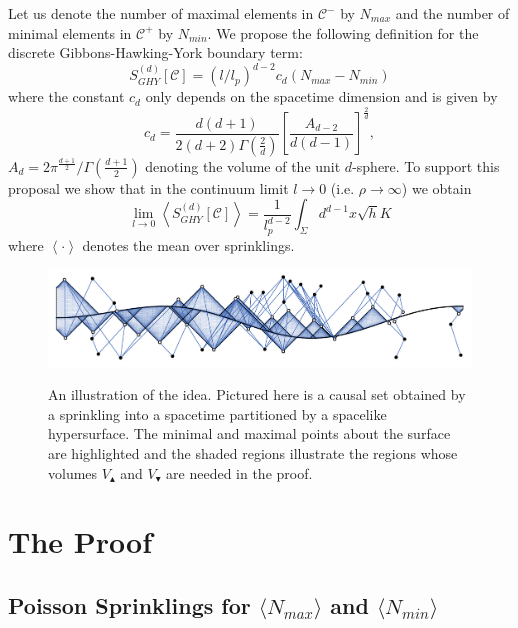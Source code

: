 \documentclass[12pt]{article}
\newcommand{\be}{\begin{equation}}
\newcommand{\ee}{\end{equation}}
\newcommand{\mb}[1]{\marginnote{\texttt{\small MB:\,#1}}}
\begin{document}
Let us denote the number of maximal elements in $\mathcal C^-$ by $N_{max}$ and the number of minimal elements in $\mathcal C^+$  by $N_{min}$. We propose the following definition for the discrete Gibbons-Hawking-York boundary term:\mb{$S[\mathcal C, \Sigma]$?}
\be\label{GH_boundary_to_causet}
S^{(d)}_{GHY}[\mathcal C]=\left(l/l_p\right)^{d-2}c_{d}\left(N_{max}-N_{min}\right)
\ee
where the constant $c_{d}$ only depends on the spacetime dimension and is given by
\be\label{Cn}
c_{d}=\frac{d(d+1)}{2(d+2)\Gamma\left(\frac{2}{d}\right)}\left[\frac{A_{d-2}}{d(d-1)}\right]^{\frac{2}{d}},
\ee
$A_d=2\pi^\frac{d+1}2/\Gamma\left(\frac{d+1}{2}\right)$ denoting the volume of the unit $d$-sphere. To support this proposal we show that in the continuum limit $l\rightarrow 0$ (i.e. $\rho\rightarrow\infty$) we obtain
\be
\lim_{l\rightarrow0}\left\langle S^{(d)}_{GHY}[\mathcal C] \right\rangle= \frac{1}{l_p^{d-2}}\int_{\Sigma} d^{d-1}x \sqrt{h} K\label{eq:mainconjecture}
\ee
where $\left\langle\cdot\right\rangle$ denotes the mean over sprinklings.
\begin{figure}
  \centering
   {\includegraphics[width=\textwidth]{minmaxplot}}
     \caption{An illustration of the idea. Pictured here is a causal set obtained by a sprinkling into a spacetime partitioned by a spacelike hypersurface. The minimal and maximal points about the surface are highlighted and the shaded regions illustrate the regions whose volumes $V_\blacktriangle$ and $V_\blacktriangledown$ are needed in the proof.}
     \label{fig:Nmin_Nmax}
\end{figure}

\section{The Proof}

\subsection{Poisson Sprinklings for $\langle N_{max}\rangle$ and $\langle N_{min}\rangle$}
\end{document}
